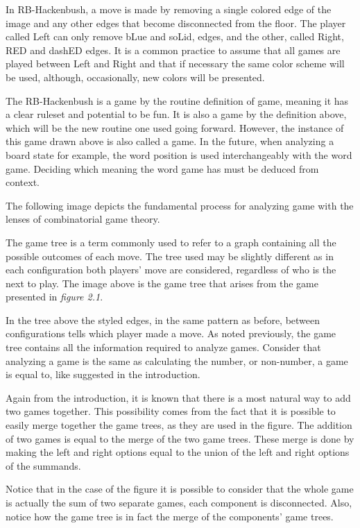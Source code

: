 In RB-Hackenbush, a move is made by removing a single colored edge of the image and any other edges that become disconnected from the floor. The player called Left can only remove bLue and soLid, edges, and the other, called Right, RED and dashED edges. It is a common practice to assume that all games are played between Left and Right and that if necessary the same color scheme will be used, although, occasionally, new colors will be presented.

The RB-Hackenbush is a game by the routine definition of game, meaning it has a clear ruleset and potential to be fun. It is also a game by the definition above, which will be the new routine one used going forward. However, the instance of this game drawn above is also called a game. In the future, when analyzing a board state for example, the word position is used interchangeably with the word game. Deciding which meaning the word game has must be deduced from context.

The following image depicts the fundamental process for analyzing game with the lenses of combinatorial game theory.



The game tree is a term commonly used to refer to a graph containing all the possible outcomes of each move. The tree used may be slightly different as in each configuration both players' move are considered, regardless of who is the next to play. The image above is the game tree that arises from the game presented in \textit{figure 2.1}.

In the tree above the styled edges, in the same pattern as before, between configurations tells which player made a move. As noted previously, the game tree contains all the information required to analyze games. Consider that analyzing a game is the same as calculating the number, or non-number, a game is equal to, like suggested in the introduction.

Again from the introduction, it is known that there is a most natural way to add two games together. This possibility comes from the fact that it is possible to easily merge together the game trees, as they are used in the figure. The addition of two games is equal to the merge of the two game trees. These merge is done by making the left and right options equal to the union of the left and right options of the summands.

Notice that in the case of the figure it is possible to consider that the whole game is actually the sum of two separate games, each component is disconnected. Also, notice how the game tree is in fact the merge of the components' game trees.

